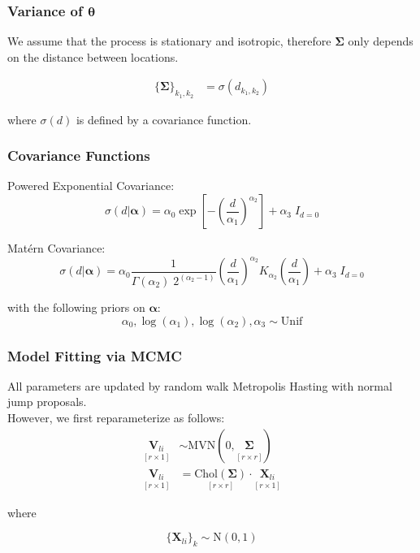 \begin{frame}
\frametitle{Variance of $\bm\theta$}

We assume that the process is stationary and isotropic, therefore $\bm\Sigma$ only depends on the distance between locations.

\begin{align*}
\{\bm\Sigma\}_{k_1,k_2} &= \sigma(d_{k_1,k_2})
\end{align*}

where $\sigma(d)$ is defined by a covariance function.

\vspace{2mm}



\end{frame}



\begin{frame}
\frametitle{Covariance Functions}

Powered Exponential Covariance:
\[
\sigma(d|\bm\alpha) = \alpha_0 \exp\left[-\left(\frac{d}{\alpha_1}\right)^{\alpha_2}\right] + \alpha_3 \; I_{d=0}
\] 

Mat\'ern Covariance:
\[
\sigma(d|\bm\alpha) = \alpha_0 \frac{1}{\Gamma(\alpha_2)\;2^{(\alpha_2-1)}} \left(\frac{d}{\alpha_1}\right)^{\alpha_2} K_{\alpha_2}\left(\frac{d}{\alpha_1}\right)+ \alpha_3 \; I_{d=0}
\]

with the following priors on $\bm \alpha$:
\[ \alpha_0, \log(\alpha_1), \log(\alpha_2), \alpha_3 \sim \text{Unif}\]
\end{frame}



\begin{frame}
\frametitle{Model Fitting via MCMC}

All parameters are updated by random walk Metropolis Hasting with normal jump proposals.\\
\vspace{5mm}
However, we first reparameterize as follows:
\begin{align*}
\underset{[r \times 1]}{\bm V_{li}} &\sim \text{MVN}(0,\underset{[r \times r]}{\bm\Sigma_{}}) \\
\underset{[r \times 1]}{\bm V_{li}} &= \underset{[r \times r]}{\text{Chol}(\bm\Sigma)} \cdot \underset{[r \times 1]}{\bm X_{li}}
\end{align*}

where

\[ \{\bm X_{li}\}_k \sim \text{N}(0,1) \]

\end{frame}



